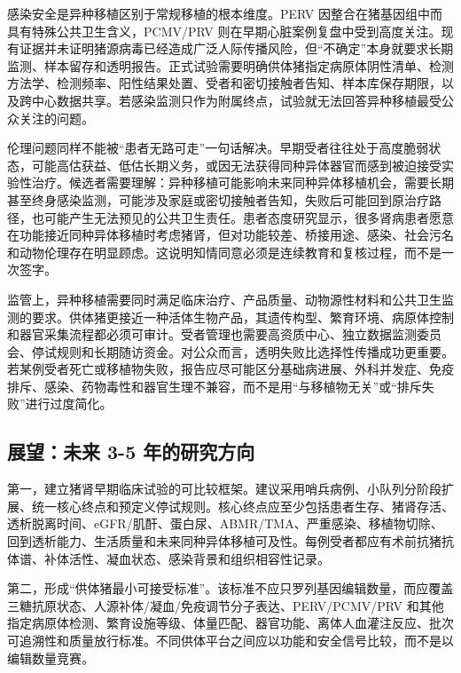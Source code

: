 \documentclass[
  chinese,
  11pt,a4paper]{article}
\begin{document}
感染安全是异种移植区别于常规移植的根本维度。PERV
因整合在猪基因组中而具有特殊公共卫生含义，PCMV/PRV
则在早期心脏案例复盘中受到高度关注。现有证据并未证明猪源病毒已经造成广泛人际传播风险，但``不确定''本身就要求长期监测、样本留存和透明报告\citep{virussafetyof2022, internationalxenotransplantationassociat2}。正式试验需要明确供体猪指定病原体阴性清单、检测方法学、检测频率、阳性结果处置、受者和密切接触者告知、样本库保存期限，以及跨中心数据共享。若感染监测只作为附属终点，试验就无法回答异种移植最受公众关注的问题。

伦理问题同样不能被``患者无路可走''一句话解决。早期受者往往处于高度脆弱状态，可能高估获益、低估长期义务，或因无法获得同种异体器官而感到被迫接受实验性治疗。候选者需要理解：异种移植可能影响未来同种异体移植机会，需要长期甚至终身感染监测，可能涉及家庭或密切接触者告知，失败后可能回到原治疗路径，也可能产生无法预见的公共卫生责任\citep{expertopinionspecial2022, informedconsentfor2022, patientsinformationneeds2025}。患者态度研究显示，很多肾病患者愿意在功能接近同种异体移植时考虑猪肾，但对功能较差、桥接用途、感染、社会污名和动物伦理存在明显顾虑\citep{attitudesofpatients2023, transplantpatientsperceptions2025}。这说明知情同意必须是连续教育和复核过程，而不是一次签字。

监管上，异种移植需要同时满足临床治疗、产品质量、动物源性材料和公共卫生监测的要求。供体猪更接近一种活体生物产品，其遗传构型、繁育环境、病原体控制和器官采集流程都必须可审计。受者管理也需要高资质中心、独立数据监测委员会、停试规则和长期随访资金。对公众而言，透明失败比选择性传播成功更重要。若某例受者死亡或移植物失败，报告应尽可能区分基础病进展、外科并发症、免疫排斥、感染、药物毒性和器官生理不兼容，而不是用``与移植物无关''或``排斥失败''进行过度简化。

\subsection{展望：未来 3-5
年的研究方向}\label{ux5c55ux671bux672aux6765-3-5-ux5e74ux7684ux7814ux7a76ux65b9ux5411}

第一，建立猪肾早期临床试验的可比较框架。建议采用哨兵病例、小队列分阶段扩展、统一核心终点和预定义停试规则。核心终点应至少包括患者生存、猪肾存活、透析脱离时间、eGFR/肌酐、蛋白尿、ABMR/TMA、严重感染、移植物切除、回到透析能力、生活质量和未来同种异体移植可及性。每例受者都应有术前抗猪抗体谱、补体活性、凝血状态、感染背景和组织相容性记录。

第二，形成``供体猪最小可接受标准''。该标准不应只罗列基因编辑数量，而应覆盖三糖抗原状态、人源补体/凝血/免疫调节分子表达、PERV/PCMV/PRV
和其他指定病原体检测、繁育设施等级、体量匹配、器官功能、离体人血灌注反应、批次可追溯性和质量放行标准。不同供体平台之间应以功能和安全信号比较，而不是以编辑数量竞赛。
\end{document}
